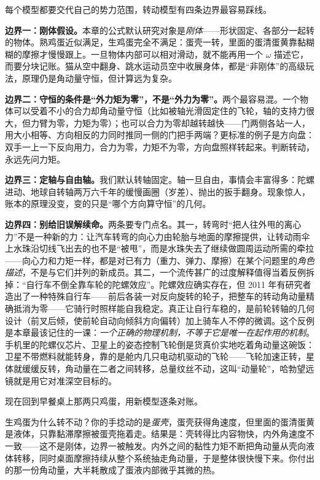 
每个模型都要交代自己的势力范围，转动模型有四条边界最容易踩线。

\textbf{边界一：刚体假设。}本章的公式默认研究对象是\emph{刚体}——形状固定、各部分一起转的物体。熟鸡蛋近似满足，生鸡蛋完全不满足：蛋壳一转，里面的蛋清蛋黄靠黏糊糊的摩擦才慢慢跟上。一旦物体内部可以相对滑动，就不能再用一个 \(\omega\) 描述它，而要分块记账。猫从空中翻身、跳水运动员空中收展身体，都是“非刚体”的高级玩法，原理仍是角动量守恒，但计算远为复杂。

\textbf{边界二：守恒的条件是“外力矩为零”，不是“外力为零”。}两个最容易混。一个物体可以受着不小的合力却角动量守恒（比如被轴光滑固定住的飞轮，轴的支持力很大，但力臂为零，力矩为零）；也可以合力为零却越转越快——门两侧各站一人，用大小相等、方向相反的力同时推同一侧的门把手两端？更标准的例子是方向盘：双手一上一下反向用力，合力为零，力矩不为零，方向盘照样转起来。判断转动，永远先问力矩。

\textbf{边界三：定轴与自由轴。}我们默认转轴固定。轴一旦自由，事情会丰富得多：陀螺进动、地球自转轴两万六千年的缓慢画圈（岁差）、抛出的扳手翻身。现象惊人，账本的原理没变，变的只是“哪个方向算守恒”的几何。

\textbf{边界四：别给旧误解续命。}两条要专门点名。其一，转弯时“把人往外甩的离心力”不是一种新的力：让汽车转弯的向心力由轮胎与地面的摩擦提供，让转动雨伞上水珠沿切线飞出去的也不是“被甩”，而是水珠失去了继续做圆周运动所需的牵拉——向心力和力矩一样，都是对已有力（重力、弹力、摩擦）在某个问题里的\emph{角色描述}，不是与它们并列的新成员。其二，一个流传甚广的过度解释值得当着反例拆掉：“自行车不倒全靠车轮的陀螺效应”。陀螺效应确实存在，但 2011 年有研究者造出了一种特殊自行车——前后各装一对反向旋转的轮子，把整车的转动角动量精确抵消为零——它骑行时照样能自我稳定。真正让自行车稳的，是前轮转轴的几何设计（前叉后倾，使前轮自动向倾斜方向偏转）加上骑车人不停的微调。这个反例是本章最该记住的一课：\emph{一个正确的物理机制，不等于它是唯一在起作用的机制}。手机里的陀螺仪芯片、卫星上的姿态控制飞轮倒是货真价实地吃着角动量这碗饭：卫星不带燃料就能转身，靠的是舱内几只电动机驱动的飞轮——飞轮加速正转，星体就缓缓反转，角动量在二者之间转移，总量纹丝不动，这叫“动量轮”，哈勃望远镜就是用它对准深空目标的。


现在回到早餐桌上那两只鸡蛋，用新模型逐条对账。

生鸡蛋为什么转不动？你的手捻动的是\emph{蛋壳}，蛋壳获得角速度，但里面的蛋清蛋黄是液体，只靠黏滞摩擦被蛋壳拖着走。结果是：壳转得比内容物快，内外角速度不一致——这不是刚体，边界一被触发。内外之间的黏性力矩不断把角动量从壳向液体转移，同时桌面摩擦持续从整个系统抽走角动量，于是整体很快慢下来。你付出的那一份角动量，大半耗散成了蛋液内部微乎其微的热。

